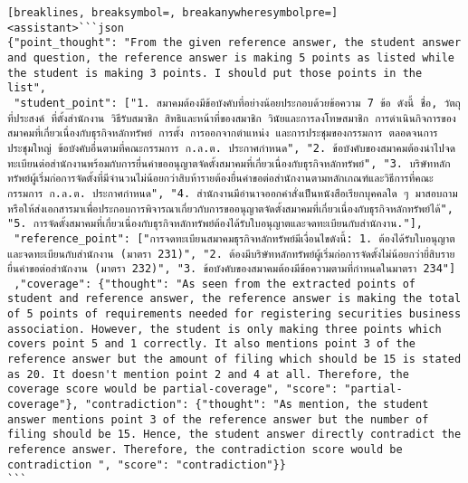 \begin{Verbatim}[breaklines, breaksymbol=, breakanywheresymbolpre=]
<assistant>```json
{"point_thought": "From the given reference answer, the student answer and question, the reference answer is making 5 points as listed while the student is making 3 points. I should put those points in the list",
 "student_point": ["1. สมาคมต้องมีข้อบังคับที่อย่างน้อยประกอบด้วยข้อความ 7 ข้อ ดังนี้ ชื่อ, วัตถุที่ประสงค์ ที่ตั้งสำนักงาน วิธีรับสมาชิก สิทธิและหน้าที่ของสมาชิก วินัยและการลงโทษสมาชิก การดำเนินกิจการของสมาคมที่เกี่ยวเนื่องกับธุรกิจหลักทรัพย์ การตั้ง การออกจากตำแหน่ง และการประชุมของกรรมการ ตลอดจนการประชุมใหญ่ ข้อบังคับอื่นตามที่คณะกรรมการ ก.ล.ต. ประกาศกำหนด", "2. ข้อบังคับของสมาคมต้องนำไปจดทะเบียนต่อสำนักงานพร้อมกับการยื่นคำขออนุญาตจัดตั้งสมาคมที่เกี่ยวเนื่องกับธุรกิจหลักทรัพย์", "3. บริษัทหลักทรัพย์ผู้เริ่มก่อการจัดตั้งที่มีจำนวนไม่น้อยกว่าสิบห้ารายต้องยื่นคำขอต่อสำนักงานตามหลักเกณฑ์และวิธีการที่คณะกรรมการ ก.ล.ต. ประกาศกำหนด", "4. สำนักงานมีอำนาจออกคำสั่งเป็นหนังสือเรียกบุคคลใด ๆ มาสอบถามหรือให้ส่งเอกสารมาเพื่อประกอบการพิจารณาเกี่ยวกับการขออนุญาตจัดตั้งสมาคมที่เกี่ยวเนื่องกับธุรกิจหลักทรัพย์ได้", "5. การจัดตั้งสมาคมที่เกี่ยวเนื่องกับธุรกิจหลักทรัพย์ต้องได้รับใบอนุญาตและจดทะเบียนกับสำนักงาน."],
 "reference_point": ["การจดทะเบียนสมาคมธุรกิจหลักทรัพย์มีเงื่อนไขดังนี้: 1. ต้องได้รับใบอนุญาตและจดทะเบียนกับสำนักงาน (มาตรา 231)", "2. ต้องมีบริษัทหลักทรัพย์ผู้เริ่มก่อการจัดตั้งไม่น้อยกว่ายี่สิบรายยื่นคำขอต่อสำนักงาน (มาตรา 232)", "3. ข้อบังคับของสมาคมต้องมีข้อความตามที่กำหนดในมาตรา 234"]
 ,"coverage": {"thought": "As seen from the extracted points of student and reference answer, the reference answer is making the total of 5 points of requirements needed for registering securities business association. However, the student is only making three points which covers point 5 and 1 correctly. It also mentions point 3 of the reference answer but the amount of filing which should be 15 is stated as 20. It doesn't mention point 2 and 4 at all. Therefore, the coverage score would be partial-coverage", "score": "partial-coverage"}, "contradiction": {"thought": "As mention, the student answer mentions point 3 of the reference answer but the number of filing should be 15. Hence, the student answer directly contradict the reference answer. Therefore, the contradiction score would be contradiction ", "score": "contradiction"}}
```

\end{Verbatim}

